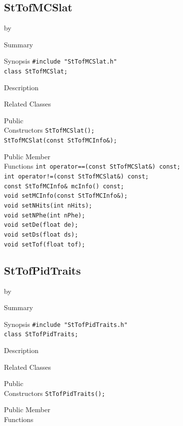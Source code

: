 \documentclass[twoside]{article}
\newcommand{\entrylabel}[1]{\mbox{\textbf{{#1}}}\hfil}%
\newenvironment{entry}
{\begin{list}{}%
    {\renewcommand{\makelabel}{\entrylabel}%
     \setlength{\labelwidth}{90pt}%
     \setlength{\leftmargin}{\labelwidth}
     \advance\leftmargin by \labelsep%
      }%
    }%
  {\end{list}}
\newcommand{\Entrylabel}[1]%
{\raisebox{0pt}[1ex][0pt]{\makebox[\labelwidth][l]%
    {\parbox[t]{\labelwidth}{\hspace{0pt}\textbf{{#1}}}}}}
\newenvironment{Entry}%
{\renewcommand{\entrylabel}{\Entrylabel}\begin{entry}}%
  {\end{entry}}
\begin{document}
\subsection{StTofMCSlat}
\label{sec:StTofMCSlat}
\begin{Entry}
\item[Summary]
\item[Synopsis]
    \verb+#include "StTofMCSlat.h"+\\
    \verb+class StTofMCSlat;+\\
\item[Description]
\item[Related Classes]
\item[Public\\ Constructors]
    \verb+StTofMCSlat();+\\
    \verb+StTofMCSlat(const StTofMCInfo&);+\\
\item[Public Member\\ Functions]
    \verb+int operator==(const StTofMCSlat&) const;+\\
    \verb+int operator!=(const StTofMCSlat&) const;+\\
    \verb+const StTofMCInfo& mcInfo() const;+\\
    \verb+void setMCInfo(const StTofMCInfo&);+\\
    \verb+void setNHits(int nHits);+\\
    \verb+void setNPhe(int nPhe);+\\
    \verb+void setDe(float de);+\\
    \verb+void setDs(float ds);+\\
    \verb+void setTof(float tof);+\\
\end{Entry}
\clearpage

\subsection{StTofPidTraits}
\label{sec:StTofPidTraits}
\begin{Entry}
\item[Summary]
\item[Synopsis]
    \verb+#include "StTofPidTraits.h"+\\
    \verb+class StTofPidTraits;+\\
\item[Description]
\item[Related Classes]
\item[Public\\ Constructors]
    \verb+StTofPidTraits();+\\
\item[Public Member\\ Functions]
\end{Entry}
\clearpage
\end{document}
